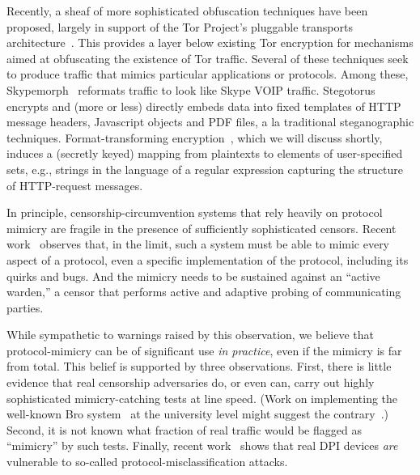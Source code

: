 Recently, a sheaf of more sophisticated obfuscation techniques have
been proposed, largely in support of the Tor Project's
pluggable transports architecture~\cite{Tor:pluggable}. This provides 
a layer below existing Tor encryption for mechanisms aimed at obfuscating 
the existence of Tor traffic.  Several of these techniques seek to
produce traffic that mimics particular applications or protocols. 
Among these, Skypemorph~\cite{Skypemorph} reformats 
traffic to look like Skype VOIP traffic. Stegotorus~\cite{Stegotorus}
encrypts and (more or less) directly embeds data into fixed
templates of HTTP message headers, Javascript objects and PDF files,
{a la} traditional steganographic techniques.  Format-transforming
encryption~\cite{Dyer-2013}, which we will discuss shortly, induces
a (secretly keyed) mapping from plaintexts to elements of user-specified sets,
e.g., strings
in the language of a regular expression capturing the structure of 
HTTP-request messages.


In principle, censorship-circumvention
systems that rely heavily on protocol mimicry are fragile in the
presence of sufficiently sophisticated censors.  Recent
work~\cite{HoumansadrBS13} observes that, in the limit, such a system
must be able to mimic every aspect of a protocol, even a specific
implementation of the protocol, including its quirks and bugs.  And
the mimicry needs to be sustained against an ``active warden,'' a
censor that performs active and adaptive probing of communicating
parties.

While sympathetic to warnings raised by this observation, we believe
that protocol-mimicry can be of significant use {\em in
  practice}, even if the mimicry is far from total.  This belief is
supported by three observations.  First, there is little evidence that real
censorship adversaries do, or even can, carry out highly sophisticated
mimicry-catching tests at line speed.  (Work on implementing the
well-known Bro system~\cite{Bro} at the university level might 
suggest the contrary~\cite{DFPS-bro}.)
Second, it is not known what
fraction of real traffic would be flagged as ``mimicry'' by such
tests.  Finally, recent work~\cite{Dyer-2013} shows that real DPI devices
\textit{are} vulnerable to so-called protocol-misclassification attacks. 

